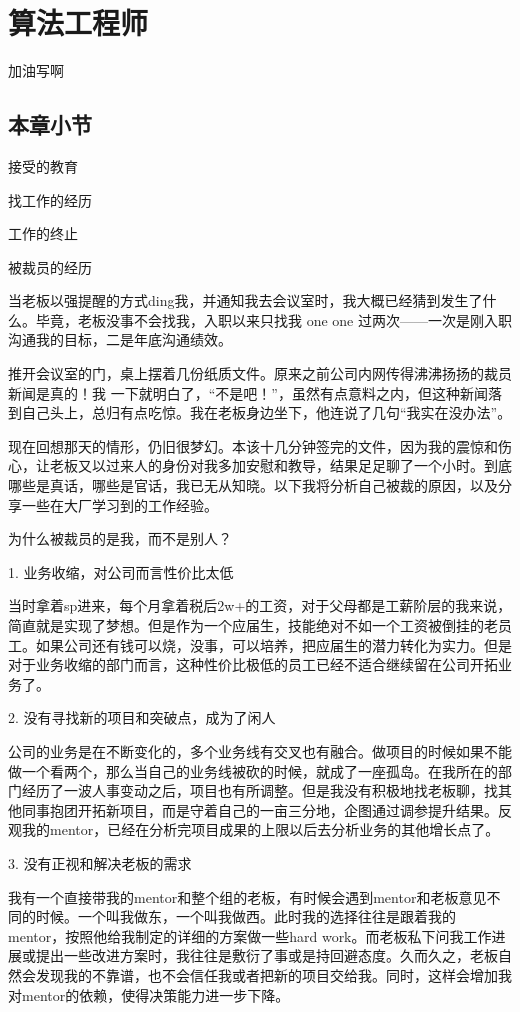 \chapter{算法工程师}

加油写啊

\section{本章小节}

接受的教育

找工作的经历

工作的终止

被裁员的经历

当老板以强提醒的方式ding我，并通知我去会议室时，我大概已经猜到发生了什么。毕竟，老板没事不会找我，入职以来只找我 one one 过两次——一次是刚入职沟通我的目标，二是年底沟通绩效。

推开会议室的门，桌上摆着几份纸质文件。原来之前公司内网传得沸沸扬扬的裁员新闻是真的！我 一下就明白了，“不是吧！”，虽然有点意料之内，但这种新闻落到自己头上，总归有点吃惊。我在老板身边坐下，他连说了几句“我实在没办法”。

现在回想那天的情形，仍旧很梦幻。本该十几分钟签完的文件，因为我的震惊和伤心，让老板又以过来人的身份对我多加安慰和教导，结果足足聊了一个小时。到底哪些是真话，哪些是官话，我已无从知晓。以下我将分析自己被裁的原因，以及分享一些在大厂学习到的工作经验。

为什么被裁员的是我，而不是别人？

1. 业务收缩，对公司而言性价比太低

当时拿着sp进来，每个月拿着税后2w+的工资，对于父母都是工薪阶层的我来说，简直就是实现了梦想。但是作为一个应届生，技能绝对不如一个工资被倒挂的老员工。如果公司还有钱可以烧，没事，可以培养，把应届生的潜力转化为实力。但是对于业务收缩的部门而言，这种性价比极低的员工已经不适合继续留在公司开拓业务了。

2. 没有寻找新的项目和突破点，成为了闲人

公司的业务是在不断变化的，多个业务线有交叉也有融合。做项目的时候如果不能做一个看两个，那么当自己的业务线被砍的时候，就成了一座孤岛。在我所在的部门经历了一波人事变动之后，项目也有所调整。但是我没有积极地找老板聊，找其他同事抱团开拓新项目，而是守着自己的一亩三分地，企图通过调参提升结果。反观我的mentor，已经在分析完项目成果的上限以后去分析业务的其他增长点了。

3. 没有正视和解决老板的需求

我有一个直接带我的mentor和整个组的老板，有时候会遇到mentor和老板意见不同的时候。一个叫我做东，一个叫我做西。此时我的选择往往是跟着我的mentor，按照他给我制定的详细的方案做一些hard work。而老板私下问我工作进展或提出一些改进方案时，我往往是敷衍了事或是持回避态度。久而久之，老板自然会发现我的不靠谱，也不会信任我或者把新的项目交给我。同时，这样会增加我对mentor的依赖，使得决策能力进一步下降。

